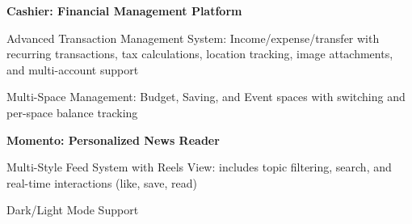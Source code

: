 \vspace{\projectspacing}

\textbf{Cashier: Financial Management Platform}
\item Advanced Transaction Management System: Income/expense/transfer with recurring transactions, tax \filbreak calculations, location tracking, image attachments, and multi-account support
\item Multi-Space Management: Budget, Saving, and Event spaces with switching and per-space balance tracking

\vspace{\projectspacing}

\textbf{Momento: Personalized News Reader}
\item Multi-Style Feed System with Reels View: includes topic filtering, search, and real-time interactions (like, save, read)
\item Dark/Light Mode Support 

